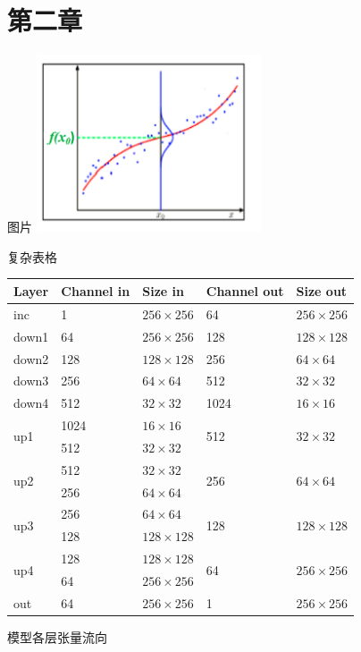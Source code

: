 \documentclass{beamer}
\begin{document}
\section{第二章}
\begin{frame}{图片}
    \centering
    \includegraphics[width=0.5\textwidth]{assets/example/6.2.1.png}
\end{frame}

\begin{frame}{复杂表格}
    \centering
    \begin{table}[htb]
        \centering
        \small
        \begin{tabular}{p{2.5cm}p{4cm}p{4cm}p{4cm}p{3.5cm}}
            \toprule
            \textbf{Layer} & \textbf{Channel in} & \textbf{Size in} & \textbf{Channel out} & \textbf{Size out}\\
            \midrule
            inc & 1 & $256\times256$ & 64 & $256\times256$\\
            \midrule
            down1 & 64 & $256\times256$ & 128 & $128\times128$\\
            down2 & 128 & $128\times128$ & 256 & $64\times64$\\
            down3 & 256 & $64\times64$ & 512 & $32\times32$\\
            down4 & 512 & $32\times32$ & 1024 & $16\times16$\\
            \midrule
            \multirow{2}{*}{up1} & 1024 & $16\times16$ & \multirow{2}{*}{512} & \multirow{2}{*}{$32\times32$}\\
             & 512 & $32\times32$ &  & \\
            \midrule
            \multirow{2}{*}{up2} & 512 & $32\times32$ & \multirow{2}{*}{256} & \multirow{2}{*}{$64\times64$}\\
             & 256 & $64\times64$ &  & \\
            \midrule
            \multirow{2}{*}{up3} & 256 & $64\times64$ & \multirow{2}{*}{128} & \multirow{2}{*}{$128\times128$}\\
             & 128 & $128\times128$ &  & \\
            \midrule
            \multirow{2}{*}{up4} & 128 & $128\times128$ & \multirow{2}{*}{64} & \multirow{2}{*}{$256\times256$}\\
             & 64 & $256\times256$ &  & \\
            \midrule
            out & 64 & $256\times256$ & 1 & $256\times256$\\
            \bottomrule
        \end{tabular}
    \end{table}
    \small 模型各层张量流向
\end{frame}
\end{document}
